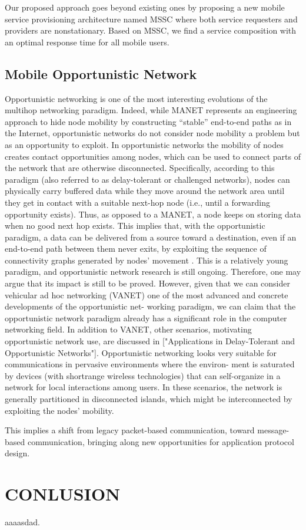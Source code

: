\documentclass[10pt,journal,compsoc]{IEEEtran}
\begin{document}
Our proposed approach goes beyond existing ones by proposing a new mobile service provisioning architecture named MSSC where both service requesters and providers are nonstationary. Based on MSSC, we find a service composition with an optimal response time for all mobile users.

\subsection{Mobile Opportunistic Network}
Opportunistic networking is one of the most interesting evolutions of the multihop networking paradigm. Indeed, while MANET represents an engineering approach to hide node mobility by constructing “stable” end-to-end paths as in the Internet, opportunistic networks do not consider node mobility a problem but as an opportunity to exploit. In opportunistic networks the mobility of nodes creates contact opportunities among nodes, which can be used to connect parts of the network that are otherwise disconnected. Specifically, according to this paradigm (also referred to as delay-tolerant or challenged networks), nodes can physically carry buffered data while they move around the network area until they get in contact with a suitable next-hop node (i.e., until a forwarding opportunity exists). Thus, as opposed to a MANET, a node keeps on storing data when no good next hop exists. This implies that, with the opportunistic paradigm, a data can be delivered from a source toward a destination, even if an end-to-end path between them never exits, by exploiting the sequence of connectivity graphs generated by nodes’ movement \cite{acer2011connectivity,ferretti2013shaping}. This is a relatively young paradigm, and opportunistic network research is still ongoing. Therefore, one may argue that its impact is still to be proved. However, given that we can consider vehicular ad hoc networking (VANET) one of the most advanced and concrete developments of the opportunistic net- working paradigm, we can claim that the opportunistic network paradigm already has a significant role in the computer networking field.
In addition to VANET, other scenarios, motivating opportunistic network use, are discussed in \cite{melodia2013mobile}["Applications in Delay-Tolerant and Opportunistic Networks"]. Opportunistic networking looks very suitable for communications in pervasive environments where the environ- ment is saturated by devices (with shortrange wireless technologies) that can self-organize in a network for local interactions among users. In these scenarios, the network is generally partitioned in disconnected islands, which might be interconnected by exploiting the nodes’ mobility.

This implies a shift from legacy packet-based communication, toward message-based communication, bringing along new opportunities for application protocol design.



\section{CONLUSION}
aaaasdad\cite{Wu2014}\cite{Pu2017}.




\end{document}
